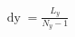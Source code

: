 \documentclass[preview]{standalone}
\begin{document}
\begin{align*}
\mathop{\mathrm{d}y}=\frac{L_y}{N_y-1}
\end{align*}
\end{document}
